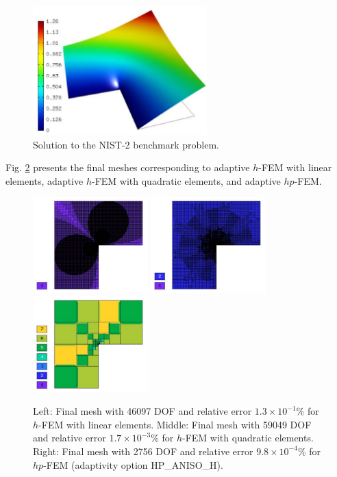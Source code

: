 \documentclass[12pt]{elsarticle}
\begin{document}
\begin{figure}[H]
\centering
\vspace{-1mm}
\includegraphics[height=5cm]{mafig7.pdf}
\vspace{-1mm}
\caption{Solution to the NIST-2 benchmark problem.}
\label{fig:sln-nist02}
\end{figure}

Fig. \ref{fig:nist-2-hp-aniso} presents the final meshes corresponding to adaptive $h$-FEM with
linear elements, adaptive $h$-FEM with quadratic elements, and adaptive $hp$-FEM.

\begin{figure}[H]
\centering
\vspace{-2mm}
\includegraphics[height=3.7cm]{mafig8.pdf}
\includegraphics[height=3.7cm]{mafig9.pdf}
\includegraphics[height=3.7cm]{mafig10.pdf}
\vspace{-2mm}
\caption{
Left: Final mesh with 46097 DOF and relative error $1.3\times10^{-1}$\% for $h$-FEM with linear elements.
Middle: Final mesh with 59049 DOF and relative error $1.7\times10^{-3}$\% for $h$-FEM with quadratic elements.
Right: Final mesh with 2756 DOF and relative error $9.8\times10^{-4}$\% for $hp$-FEM (adaptivity option HP\_ANISO\_H).}
\label{fig:nist-2-hp-aniso}
\vspace{-2mm}
\end{figure}
\end{document}
